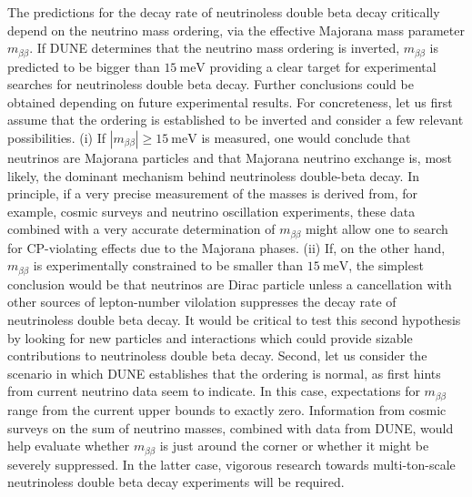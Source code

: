 The predictions for the decay rate of neutrinoless double beta decay critically depend on the neutrino mass ordering, via the effective Majorana mass parameter $m_{\beta \beta}$. If DUNE determines that the neutrino mass ordering is inverted, $m_{\beta \beta}$ is predicted to be bigger than $15~\mathrm{meV}$ providing a clear target for experimental searches for neutrinoless double beta decay. Further conclusions could be obtained depending on future experimental results. For concreteness, let us first assume that the ordering is established to be inverted and consider a few relevant possibilities. (i) If  $|m_{\beta \beta}| \geq 15~\mathrm{meV}$ is measured, one would conclude that neutrinos are Majorana particles and that Majorana neutrino exchange is, most likely, the dominant mechanism behind neutrinoless double-beta decay. In principle, if a very precise measurement of the masses is derived from, for example, cosmic surveys and neutrino oscillation experiments, these data combined with a very accurate determination of $m_{\beta \beta}$ might allow one to search for CP-violating effects due to the Majorana phases. (ii) If, on the other hand, $m_{\beta \beta}$ is experimentally constrained to be smaller than  $15~\mathrm{meV}$, the simplest conclusion would be that neutrinos are Dirac particle unless a cancellation with other sources of lepton-number vilolation suppresses the decay rate of neutrinoless double beta decay. It would be critical to test this second hypothesis by looking for new particles and interactions which could provide sizable contributions to neutrinoless double beta decay. Second, let us consider the scenario in which DUNE establishes that the ordering is normal, as first hints from current neutrino data seem to indicate. In this case, expectations for $m_{\beta \beta}$ range from the current upper bounds to exactly zero. Information from cosmic surveys on the sum of neutrino masses, combined with data from DUNE, would help evaluate whether $m_{\beta \beta}$ is just around the corner or whether it might be severely suppressed. In the latter case, vigorous research towards multi-ton-scale neutrinoless double beta decay experiments will be required.  

%

